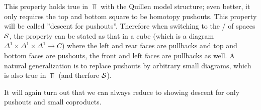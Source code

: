 This property holds true in $\Top$ with the Quillen model structure; even better, it only requires the top and bottom square to be homotopy pushouts.
This property will be called ''descent for pushouts''.
Therefore when switching to the \inftycat/ of spaces $\mathcal{S}$, the property can be stated as that in a cube (which is a diagram $\Delta^1\times\Delta^1\times\Delta^1\to C$) where the left and rear faces are pullbacks and top and bottom faces are pushouts, the front and left faces are pullbacks as well.
A natural generalization is to replace pushouts by arbitrary small diagrams, which is also true in $\Top$ (and therfore $\mathcal{S}$).

It will again turn out that we can always reduce to showing descent for only pushouts and small coproducts.